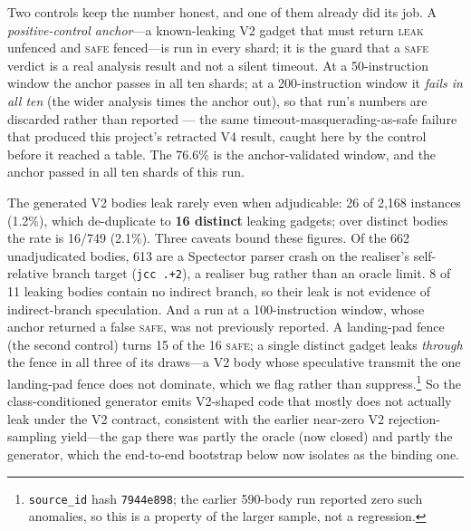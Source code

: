 \documentclass[conference]{IEEEtran}
\begin{document}
Two controls keep the number honest, and one of them already did its job. A
\emph{positive-control anchor}---a known-leaking V2 gadget that must return
\textsc{leak} unfenced and \textsc{safe} fenced---is run in every shard; it is
the guard that a \textsc{safe} verdict is a real analysis result and not a
silent timeout. At a 50-instruction window the anchor passes in all ten shards;
at a 200-instruction window it \emph{fails in all ten} (the wider analysis
times the anchor out), so that run's numbers are discarded rather than reported
--- the same timeout-masquerading-as-safe failure that produced this project's
retracted V4 result, caught here by the control before it reached a table. The
76.6\% is the anchor-validated window, and the anchor passed in all ten shards
of this run.

The generated V2 bodies leak rarely even when adjudicable: 26 of 2{,}168
instances (1.2\%), which de-duplicate to \textbf{16 distinct} leaking gadgets;
over distinct bodies the rate is 16/749 (2.1\%). Three caveats bound these
figures. Of the 662 unadjudicated bodies, 613 are a Spectector parser crash on
the realiser's self-relative branch target (\texttt{jcc .+2}), a realiser bug
rather than an oracle limit. 8 of 11 leaking bodies contain no indirect
branch, so their leak is not evidence of indirect-branch speculation. And a
run at a 100-instruction window, whose anchor returned a false \textsc{safe},
was not previously reported.
A
landing-pad fence (the second control) turns 15 of the 16 \textsc{safe}; a
single distinct gadget leaks \emph{through} the fence in all three of its
draws---a V2 body whose speculative transmit the one landing-pad fence does not
dominate, which we flag rather than suppress.\footnote{\texttt{source\_id}
hash \texttt{7944e898}; the earlier 590-body run reported zero such anomalies,
so this is a property of the larger sample, not a regression.} So the
class-conditioned generator
emits V2-shaped code that mostly does not actually leak under the V2 contract,
consistent with the earlier near-zero V2 rejection-sampling yield---the gap there was partly
the oracle (now closed) and partly the generator, which the end-to-end
bootstrap below now isolates as the binding one.
\end{document}
